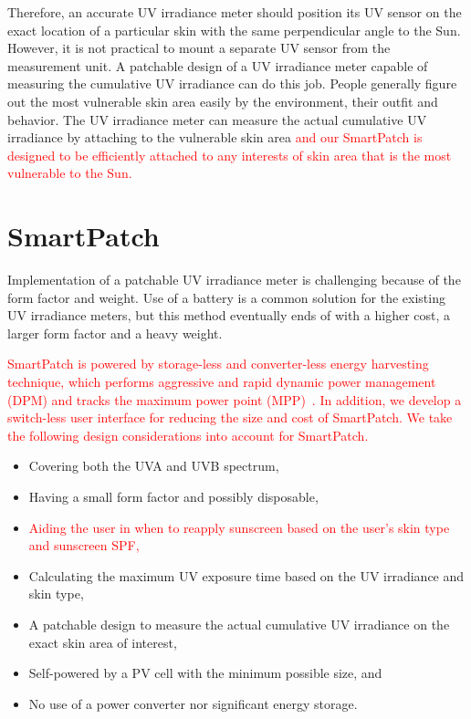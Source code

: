 \documentclass[journal]{IEEEtran}
\begin{document}
Therefore, an accurate UV irradiance meter should position its UV sensor on the exact location of a particular skin with the same perpendicular angle to the Sun. However, it is not practical to mount a separate UV sensor from the measurement unit. A patchable design of a UV irradiance meter capable of measuring the cumulative UV irradiance can do this job. People generally figure out the most vulnerable skin area easily by the environment, their outfit and behavior. The UV irradiance meter can measure the actual cumulative UV irradiance by attaching to the vulnerable skin area \textcolor{red}{and our SmartPatch is designed to be efficiently attached to any interests of skin area that is the most vulnerable to the Sun.}

\section{SmartPatch}

Implementation of a patchable UV irradiance meter is challenging because of the form factor and weight.
Use of a battery is a common solution for the existing UV irradiance meters, but this method eventually ends of with a higher cost, a larger form factor and a heavy weight.

\textcolor{red}{SmartPatch is powered by storage-less and converter-less energy harvesting technique, which performs aggressive and rapid dynamic power management (DPM) and tracks the maximum power point (MPP)~\cite{Wang:ASPDAC14}. In addition, we develop a switch-less user interface for reducing the size and cost of SmartPatch. We take the following design considerations into account for SmartPatch.}

\begin{itemize}
\item Covering both the UVA and UVB spectrum,
\item Having a small form factor and possibly disposable,
\item \textcolor{red}{Aiding the user in when to reapply sunscreen based on the user’s skin type and sunscreen SPF,}
\item Calculating the maximum UV exposure time based on the UV irradiance and skin type,
\item A patchable design to measure the actual cumulative UV irradiance on the exact skin area of interest,
\item Self-powered by a PV cell with the minimum possible size, and
\item No use of a power converter nor significant energy storage.
\end{itemize}
\end{document}
